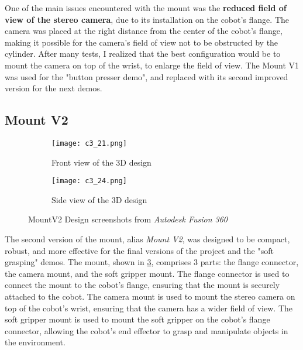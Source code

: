 One of the main issues encountered with the mount was the \textbf{reduced field of view of the stereo camera}, due to its
installation on the cobot's flange. The camera was placed at the right distance from the center of the cobot's flange,
making it possible for the camera's field of view not to be obstructed by the cylinder.
After many tests, I realized that the best configuration would be to mount the camera on top of the wrist,
to enlarge the field of view. The Mount V1 was used for the "button presser demo", and replaced with its 
second improved version for the next demos.

\subsection{Mount V2}

\begin{figure}
    \centering

    \begin{subfigure}{\textwidth}
        \texttt{[image: c3\_21.png]} %
        \caption{Front view of the 3D design}
        \label{fig:frontv2}
    \end{subfigure}
    
    \vspace{1em} %

    \begin{subfigure}{\textwidth}
        \texttt{[image: c3\_24.png]} %
        \caption{Side view of the 3D design}
        \label{fig:sidev2}
    \end{subfigure}

    \caption{MountV2 Design screenshots from \textit{Autodesk Fusion 360}}
    \label{fig:mountv2}
\end{figure}

The second version of the mount, alias \textit{Mount V2}, was designed to be compact, robust, and more effective
for the final versions of the project and the "soft grasping" demos. The mount,
shown in \ref{fig:mountv2}, comprises 3 parts:
the flange connector, the camera mount, and the soft gripper mount. The flange connector is used to connect
the mount to the cobot's flange, ensuring that the mount is securely attached to the cobot. The camera mount
is used to mount the stereo camera on top of the cobot's wrist, ensuring that the camera has a wider field of view.
The soft gripper mount is used to mount the soft gripper on the cobot's flange connector, allowing the cobot's
end effector to grasp and manipulate objects in the environment.

